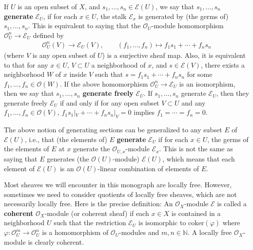 \documentclass[12pt,a4paper,notitlepage]{report}
\theoremstyle{definition}
\theoremstyle{plain}
\newcommand{\scr}{\mathscr}
\newcommand{\coker}{\mathrm{coker}}
\newcommand{\Nbb}{\mathbb N}
\numberwithin{equation}{section}
\begin{document}
If $U$ is an open subset of $X$, and $s_1,\dots,s_n\in\scr E(U)$, we say that $s_1,\dots,s_n$ \textbf{generate} $\scr E_U$, if for each $x\in U$, the stalk $\scr E_x$ is generated by (the germs of) $s_1,\dots, s_n$. This is equivalent to saying that the $\scr O_U$-module homomorphism $\scr O_U^n\rightarrow\scr E_U$ defined by 
\begin{align*}
\scr O_U^n(V)\rightarrow\scr E_U(V),\qquad (f_1,\dots,f_n)\mapsto f_1s_1+\cdots+f_ns_n
\end{align*}
(where $V$ is any open subset of $U$) is a surjective sheaf map. Also, it is equivalent to that for any $x\in U$, $V\subset U$ a neighborhood of $x$, and $s\in\scr E(V)$, there exists a neighborhood $W$ of $x$ inside $V$ such that $s=f_1s_1+\cdots+f_ns_n$ for some $f_1,\dots,f_n\in\scr O(W)$. If the above homomorphism $\scr O^n_U\rightarrow\scr E_U$ is an isomorphism, then we say that $s_1,\dots,s_n$ \textbf{generate freely} $\scr E_U$. If $s_1,\dots,s_n$ generate $\scr E_U$, then they generate freely $\scr E_U$ if and only if for any open subset $V\subset U$ and any $f_1,\dots,f_n\in\scr O(V)$, $f_1s_1|_V+\cdots+f_ns_n|_V=0$ implies $f_1=\cdots=f_n=0$.

The above notion of generating sections can be generalized to any subset $E$ of $\scr E(U)$, i.e., that (the elements of) $E$ \textbf{generate} $\scr E_U$ if for each $x\in U$, the germs of the elements of $E$ at $x$ generate the $\scr O_{U,x}$-module $\scr E_x$. This is not the same as saying that $E$ generates (the $\scr O(U)$-module) $\scr E(U)$, which means that each element of $\scr E(U)$ is an $\scr O(U)$-linear combination of elements of $E$.



Most sheaves  we will encounter in this monograph are locally free. However, sometimes we need to consider quotients of locally free sheaves, which are not necessarily locally free. Here is the precise definition:  An $\scr O_X$-module $\scr E$ is called a \textbf{coherent}  $\scr O_X$-module (or coherent sheaf) if  each $x\in X$ is contained in a neighborhood $U$ such that the restriction $\scr E_U$ is isomorphic to $\coker(\varphi)$ where $\varphi:\scr O_U^m\rightarrow\scr O_U^n$ is a homomorphism of $\scr O_U$-modules and $m,n\in\Nbb$. A locally free $\scr O_X$-module is clearly coherent.
\end{document}
